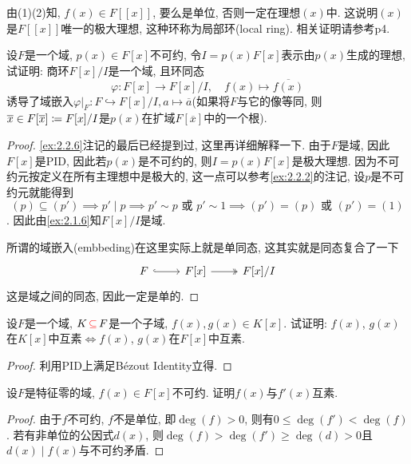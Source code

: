 \begin{remark}
    由(1)(2)知, $f(x) \in F[[x]]$, 要么是单位, 否则一定在理想$(x)$中. 这说明$(x)$是$F[[x]]$唯一的极大理想, 这种环称为局部环(local ring). 相关证明请参考\cite{atiyah1994introduction}p4.
\end{remark}

\begin{problem}\label{ex:2.3.2}
    设$F$是一个域, $p(x) \in F[x]$不可约, 令$I = p(x)F[x]$表示由$p(x)$生成的理想, 试证明: 商环$F[x]/I$是一个域, 且环同态
    \[
        \varphi:F[x] \to F[x]/I,\quad f(x) \mapsto \overline{f(x)}
    \]
    诱导了域嵌入$\varphi|_F: F \hookrightarrow F[x]/I, a \mapsto \overline{a}$(如果将$F$与它的像等同, 则$\overline{x} \in F[\overline{x}] \mathrel{\coloneqq} F[x]/I$是$p(x)$在扩域$F[\overline{x}]$中的一个根).
\end{problem}

\begin{proof}
    \ref{ex:2.2.6}注记的最后已经提到过, 这里再详细解释一下. 由于$F$是域, 因此$F[x]$是PID, 因此若$p(x)$是不可约的, 则$I = p(x)F[x]$是极大理想. 因为不可约元按定义在所有主理想中是极大的, 这一点可以参考\ref{ex:2.2.2}的注记, 设$p$是不可约元就能得到
    \[
        (p) \subseteq (p') \implies p' \mid p \implies p' \sim p \text{ 或 } p' \sim 1 \implies (p') = (p) \text{ 或 } (p') = (1)
    \]. 因此由\ref{ex:2.1.6}知$F[x]/I$是域.
    
    所谓的域嵌入(embbeding)在这里实际上就是单同态, 这其实就是同态复合了一下
    \[
        \begin{tikzcd}
            F \arrow[r, hook] & {F[x]} \arrow[r, two heads] & {F[x]/I}
        \end{tikzcd}
    \]
    这是域之间的同态, 因此一定是单的.
\end{proof}

\begin{problem}
    设$F$是一个域, $K \,\textcolor{red}{\subseteq}\, F$是一个子域, $f(x), g(x) \in K[x]$. 试证明: $f(x)$, $g(x)$在$K[x]$中互素$\Leftrightarrow f(x)$, $g(x)$在$F[x]$中互素.
\end{problem}

\begin{proof}
    利用PID上满足Bézout Identity立得.
\end{proof}

\begin{problem}\label{ex:2.3.4}
    设$F$是特征零的域, $f(x) \in F[x]$不可约. 证明$f(x)$与$f'(x)$互素.
\end{problem}

\begin{proof}
    由于$f$不可约, $f$不是单位, 即$\deg(f) > 0$, 则有$0 \leqslant \deg(f') < \deg(f)$. 若有非单位的公因式$d(x)$, 则$\deg(f) > \deg(f') \geqslant \deg(d) > 0$且$d(x) \mid f(x)$与不可约矛盾.
\end{proof}

